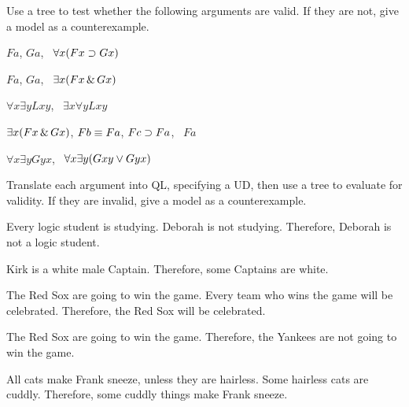\solutions
\problempart
\label{pr.QL.trees.validity}
Use a tree to test whether the following arguments are valid. If they are not, give a model as a counterexample.
\begin{earg}
\item $Fa$, $Ga$, \therefore\ $\forall x (Fx \supset Gx)$
\item $Fa$, $Ga$, \therefore\ $\exists x (Fx \,\&\, Gx)$
\item $\forall x \exists y Lxy$, \therefore\ $\exists x \forall y Lxy$
\item $\exists x (Fx \,\&\, Gx)$, $Fb \equiv Fa$, $Fc \supset Fa$, \therefore\ $Fa$
\item $\forall x \exists y Gyx$, \therefore\ $\forall x \exists y (Gxy \vee Gyx)$
\end{earg}

\problempart
\label{pr.QL.trees.translation.and.validity}
Translate each argument into QL, specifying a UD, then use a tree to evaluate for validity. If they are invalid, give a model as a counterexample.
\begin{earg}
\item Every logic student is studying. Deborah is not studying. Therefore, Deborah is not a logic student.
\item Kirk is a white male Captain. Therefore, some Captains are white.
\item The Red Sox are going to win the game. Every team who wins the game will be celebrated. Therefore, the Red Sox will be celebrated.
\item The Red Sox are going to win the game. Therefore, the Yankees are not going to win the game.
\item All cats make Frank sneeze, unless they are hairless. Some hairless cats are cuddly. Therefore, some cuddly things make Frank sneeze.
\end{earg}